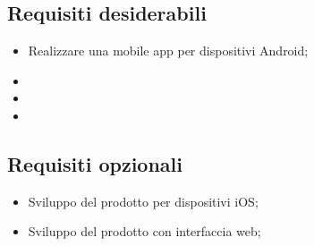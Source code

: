 \subsection{Requisiti desiderabili}
\begin{itemize}
	\item Realizzare una mobile app per dispositivi Android;
	\item
	\item
	\item
\end{itemize}
\subsection{Requisiti opzionali}
\begin{itemize}
	\item Sviluppo del prodotto per dispositivi iOS;
	\item Sviluppo del prodotto con interfaccia web;
\end{itemize}